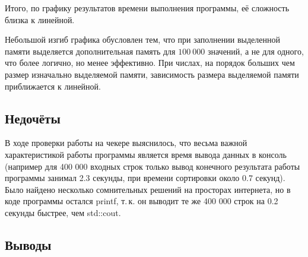 \documentclass[12pt]{article}
\begin{document}
Итого, по графику результатов времени выполнения программы, её сложность близка к линейной.
\\


Небольшой изгиб графика обусловлен тем, что при заполнении выделенной памяти выделяется дополнительная память для $100\ 000$ значений, а не для одного, что более логично, но менее эффективно. При числах, на порядок больших чем размер изначально выделяемой памяти, зависимость размера выделяемой памяти приближается к линейной.




\subsection*{Недочёты}

В ходе проверки работы на чекере выяснилось, что весьма важной характеристикой работы программы является время вывода данных в консоль (например для 400 000 входных строк только вывод конечного результата работы программы занимал 2.3 секунды, при времени сортировки около 0.7 секунд). Было найдено несколько сомнительных решений на просторах интернета, но в коде программы остался printf, т.\,к. он выводит те же 400 000 строк на 0.2 секунды быстрее, чем std::cout.

\subsection*{Выводы}
\end{document}

